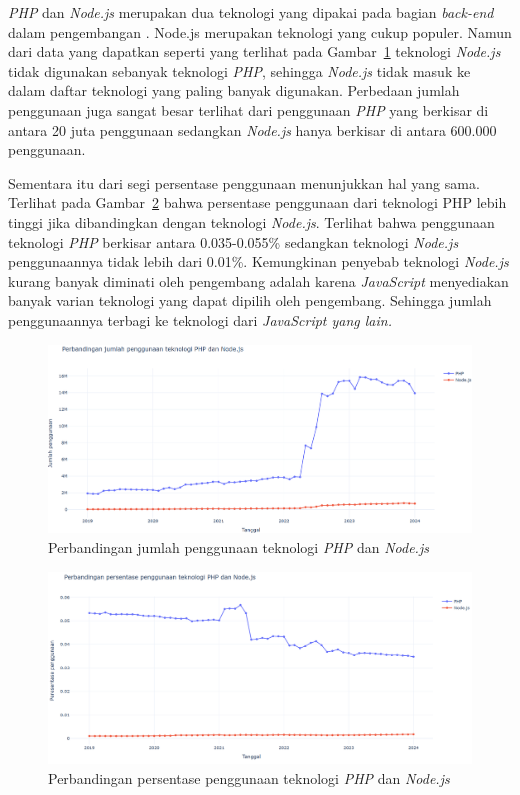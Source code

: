 \textit{PHP} dan \textit{Node.js} merupakan dua teknologi yang dipakai pada bagian \textit{back-end} dalam pengembangan \web. Node.js merupakan teknologi yang cukup populer. Namun dari data yang dapatkan seperti yang terlihat pada Gambar~\ref{fig:phpnode} teknologi \textit{Node.js} tidak digunakan sebanyak teknologi \textit{PHP}, sehingga \textit{Node.js} tidak masuk ke dalam daftar teknologi yang paling banyak digunakan. Perbedaan jumlah penggunaan juga sangat besar terlihat dari penggunaan \textit{PHP} yang berkisar di antara 20 juta penggunaan sedangkan \textit{Node.js} hanya berkisar di antara 600.000 penggunaan.

Sementara itu dari segi persentase penggunaan menunjukkan hal yang sama. Terlihat pada Gambar~\ref{fig:phpnodepersen} bahwa persentase penggunaan dari teknologi PHP lebih tinggi jika dibandingkan dengan teknologi \textit{Node.js}. Terlihat bahwa penggunaan teknologi \textit{PHP} berkisar antara 0.035-0.055\% sedangkan teknologi \textit{Node.js} penggunaannya tidak lebih dari 0.01\%. Kemungkinan penyebab teknologi \textit{Node.js} kurang banyak diminati oleh pengembang \web adalah karena \textit{JavaScript} menyediakan banyak varian teknologi yang dapat dipilih oleh pengembang. Sehingga jumlah penggunaannya terbagi ke teknologi dari \textit{JavaScript yang lain.}

\begin{figure}[H]
    \centering
    \includegraphics[width=0.7\linewidth]{Gambar/perbandinganphpnode.png}
    \caption{Perbandingan jumlah penggunaan teknologi \textit{PHP} dan \textit{Node.js}}
    \label{fig:phpnode}
\end{figure}

\begin{figure}[H]
    \centering
    \includegraphics[width=0.7\linewidth]{Gambar/Perbandinganpersentasephpnode.png}
    \caption{Perbandingan persentase penggunaan teknologi \textit{PHP} dan \textit{Node.js}}
    \label{fig:phpnodepersen}
\end{figure}

